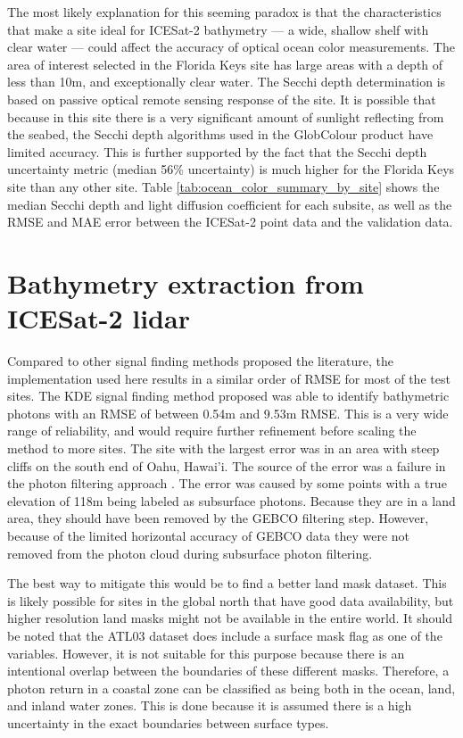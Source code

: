 The most likely explanation for this seeming paradox is that the characteristics that make a site ideal for ICESat-2 bathymetry --- a wide, shallow shelf with clear water --- could affect the accuracy of optical ocean color measurements. The area of interest selected in the Florida Keys site has large areas with a depth of less than 10m, and exceptionally clear water. The Secchi depth determination is based on passive optical remote sensing response of the site. It is possible that because in this site there is a very significant amount of sunlight reflecting from the seabed, the Secchi depth algorithms used in the GlobColour product have limited accuracy. This is further supported by the fact that the Secchi depth uncertainty metric (median 56\% uncertainty) is much higher for the Florida Keys site than any other site. Table \ref{tab:ocean_color_summary_by_site} shows the median Secchi depth and light diffusion coefficient for each subsite, as well as the RMSE and MAE error between the ICESat-2 point data and the validation data.




\section{Bathymetry extraction from ICESat-2 lidar}

Compared to other signal finding methods proposed the literature, the implementation used here results in a similar order of RMSE for most of the test sites. The KDE signal finding method proposed was able to identify bathymetric photons with an RMSE of between 0.54m and 9.53m RMSE. This is a very wide range of reliability, and would require further refinement before scaling the method to more sites. The site with the largest error was in an area with steep cliffs on the south end of Oahu, Hawai'i. The source of the error was a failure in the photon filtering approach . The error was caused by some points with a true elevation of 118m being labeled as subsurface photons. Because they are in a land area, they should have been removed by the GEBCO filtering step. However, because of the limited horizontal accuracy of GEBCO data they were not removed from the photon cloud during subsurface photon filtering.

The best way to mitigate this would be to find a better land mask dataset. This is likely possible for sites in the global north that have good data availability, but higher resolution land masks might not be available in the entire world. It should be noted that the ATL03 dataset does include a surface mask flag as one of the variables. However, it is not suitable for this purpose because there is an intentional overlap between the boundaries of these different masks. Therefore, a photon return in a coastal zone can be classified as being both in the ocean, land, and inland water zones. This is done because it is assumed there is a high uncertainty in the exact boundaries between surface types. 

